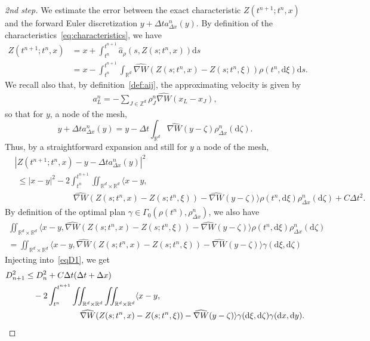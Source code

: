 \documentclass[11pt]{article}
\theoremstyle{definition}
\numberwithin{equation}{section}
\newcommand*{\dd}{\mathrm{d}}
\newcommand*{\ds}{\dd s}
\newcommand*{\dx}{\dd x}
\newcommand*{\dy}{\dd y}
\newcommand*{\dzeta}{\dd \zeta}
\newcommand*{\dxi}{\dd \xi}
\newcommand*\RR{\mathbb{R}}
\newcommand*\ZZ{\mathbb{Z}}
\newcommand*\achapo{\widehat{a}}
\newcommand*\nabWchapo{\widehat{\nabla W}}
\newenvironment{step}[1]{\begin{proof}[#1]}{\let\qed\relax \end{proof}}
\begin{document}
\begin{step}{2nd step}
We estimate the error between the exact characteristic $Z(t^{n+1};t^n,x)$ and the forward Euler discretization $y+\Delta t a^n_{\Delta x}(y)$. By definition of the characteristics~\eqref{eq:characteristics}, we have
\begin{align*}
Z(t^{n+1};t^n,x) & = x + \int_{t^n}^{t^{n+1}} \achapo_\rho(s,Z(s;t^n,x)) \ds\\
& = x - \int_{t^n}^{t^{n+1}} \int_{\RR^d}\nabWchapo(Z(s;t^n,x)-Z(s;t^n,\xi)) \rho(t^n,\dxi) \ds.
\end{align*}
We recall also that, by definition~\eqref{def:aij}, the approximating velocity is given by
\begin{align*}
a_L^n = - \sum_{J\in\ZZ^d} \rho_J^n \nabWchapo(x_L-x_J),
\end{align*}
so that for $y$, a node of the mesh,
\begin{equation*}
y + \Delta t a^n_{\Delta x}(y) = y - \Delta t \int_{\RR^d}
\nabWchapo(y - \zeta) \rho^n_{\Delta x}(\dzeta ).
\end{equation*}
Thus, by a straightforward expansion and still for $y$ a node of the mesh,
\begin{align*}
&|Z(t^{n+1};t^n,x)-y-\Delta t a^n_{\Delta x}(y)|^2\\
&\;\leq |x-y|^2 - 2\int_{t^n}^{t^{n+1}}\!\!\iint_{\RR^d\times \RR^d} \langle x-y,\\
&\qquad\qquad\qquad\quad\nabWchapo(Z(s;t^n,x)\!-\!Z(s;t^n,\xi))\!-\!\nabWchapo(y\!-\!\zeta)\rangle \rho(t^n,\dxi) \rho_{\Delta x}^n(\dzeta) + C\Delta t^2.
\end{align*}
By definition of the optimal plan $\gamma\in \Gamma_0(\rho(t^n),\rho^n_{\Delta x})$, we also have
\begin{multline*}
\iint_{\RR^d\times \RR^d} \langle x-y, \nabWchapo(Z(s;t^n,x)-Z(s;t^n,\xi))-\nabWchapo(y-\zeta)\rangle \rho(t^n,\dxi) \rho_{\Delta x}^n(\dzeta) \\
= \iint_{\RR^d\times \RR^d} \langle x-y, \nabWchapo(Z(s;t^n,x)-Z(s;t^n,\xi))-\nabWchapo(y-\zeta)\rangle \gamma(\dxi,\dzeta)
\end{multline*}
Injecting into~\eqref{eqD1}, we get
\begin{align*}
D_{n+1}^2 &\leq D_n^2 + C \Delta t(\Delta t+\Delta x) \\
&\quad- 2 \int_{t^n}^{t^{n+1}}\iint_{\RR^d\times \RR^d}\iint_{\RR^d\times \RR^d} \langle x-y, \\
&\mkern 120mu\nabWchapo(Z(s;t^n,x)-Z(s;t^n,\xi))-\nabWchapo(y-\zeta) \rangle
\gamma(\dxi,\dzeta) \gamma(\dx,\dy).

\end{align*}
\end{step}
\end{document}
